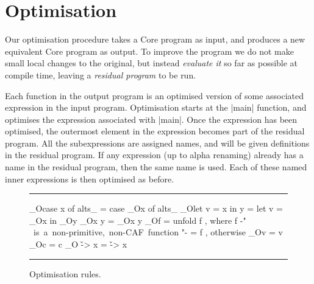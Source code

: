 \documentclass{llncs}
\newenvironment{fig}
    {\begin{figure}[tbp]\hrule}
    {\end{figure}}
\newcommand{\figend}{\hrule}
\begin{document}
\section{Optimisation}
\label{sec:optimisation}

Our optimisation procedure takes a Core program as input, and produces a new equivalent Core program as output. To improve the program we do not make small local changes to the original, but instead \textit{evaluate it} so far as possible at compile time, leaving a \textit{residual program} to be run.

Each function in the output program is an optimised version of some associated expression in the input program. Optimisation starts at the |main| function, and optimises the expression associated with |main|. Once the expression has been optimised, the outermost element in the expression becomes part of the residual program. All the subexpressions are assigned names, and will be given definitions in the residual program. If any expression (up to alpha renaming) already has a name in the residual program, then the same name is used. Each of these named inner expressions is then optimised as before.

\begin{fig}
\begin{code}
_O\<case x of alts_  \> =  case _O\<x\> \? of alts_
_O\<let v = x in y   \> =  let v = _O\<x\> \? in _O\<y\>
_O\<x y              \> =  _O\<x\> \? y
_O\<f                \> =  unfold f  , where f {-" \hbox{ is a non-primitive, non-CAF function} "-}
                        =  f         , otherwise
_O\<v                \> =  v
_O\<c                \> =  c
_O\< \v -> x         \> =  \v -> x
\end{code}
\figend
\caption{Optimisation rules.}
\label{fig:optimise}
\end{fig}
\end{document}
